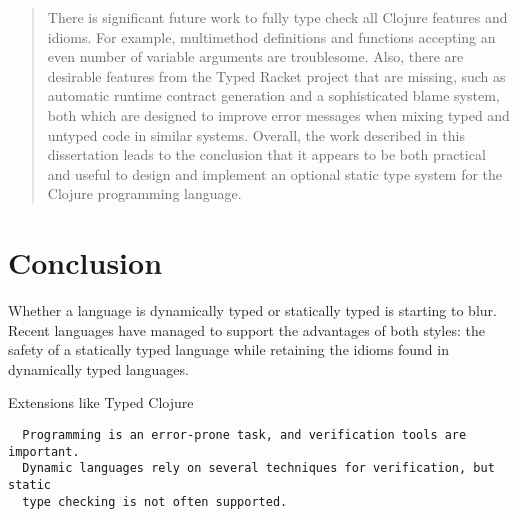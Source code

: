 \documentclass{cshonours}
\begin{document}
\begin{abstract}
There is significant future work to fully type check all Clojure features and idioms.
For example, multimethod definitions and functions accepting an even number of variable arguments
are troublesome. 
Also, there are desirable features from the Typed Racket project that are missing, such
as automatic runtime contract generation and a sophisticated blame system, 
both which are designed to improve error messages when mixing typed and untyped code in similar systems.
Overall, the work described in this dissertation leads to the conclusion that it appears to 
be both practical and useful to design and implement an optional static type system for the
Clojure programming language.

\end{abstract}

\tableofcontents













\chapter{Conclusion}

Whether a language is dynamically typed or statically typed is starting to
blur. Recent languages have managed to support the advantages of both styles:
the safety of a statically typed language while retaining the idioms found in
dynamically typed languages.

Extensions like Typed Clojure 

\begin{verbatim}
  Programming is an error-prone task, and verification tools are important.
  Dynamic languages rely on several techniques for verification, but static
  type checking is not often supported.
\end{verbatim}

\printbibliography[title=References]


\end{document}
